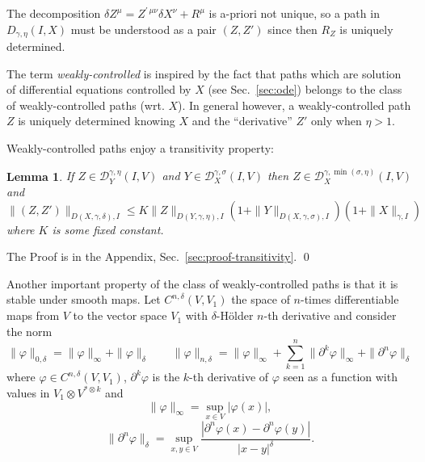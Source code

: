 \documentclass[a4paper,12pt,reqno]{amsproc}
\newcommand{\der}{\delta\!}
\newcommand{\DD}{\mathcal{D}}
\newtheorem{lemma}{Lemma}
\begin{document}
The decomposition $\der Z^\mu =  Z^{\prime\,\mu\nu} \der X^\nu + R^\mu$ is a-priori not
unique, so a path in $D_{\gamma,\eta}(I,X)$ must be understood as a
pair $(Z,Z')$ since then $R_Z$ is uniquely determined.

The term \emph{weakly-controlled} is inspired by the fact that paths
which are solution of differential equations controlled by $X$ (see
Sec.~\ref{sec:ode}) belongs to the class of weakly-controlled paths
(wrt. $X$). In general however, a weakly-controlled path $Z$ is 
uniquely determined knowing $X$ and the ``derivative'' $Z'$ only when
$\eta > 1$. 

Weakly-controlled paths enjoy  a transitivity property:
\begin{lemma}
  \label{lemma:transitivity}
If $Z \in
\DD_Y^{\gamma,\eta}(I,V)$ and $Y \in \DD_X^{\gamma,\sigma}(I,V)$ then $Z \in
\DD_X^{\gamma,\min(\sigma,\eta)}(I,V)$ and
\begin{equation*}
\|(Z,Z')\|_{D(X,\gamma,\delta),I} 
\le K \|Z\|_{D(Y,\gamma,\eta),I} (1+
   \|Y\|_{D(X,\gamma,\sigma),I})(1+ \|X\|_{\gamma,I})
\end{equation*}
where $K$ is some fixed constant.
\end{lemma}
\proof The Proof is in the Appendix,
Sec.~\ref{sec:proof-transitivity}. \qed

\bigskip
Another important property of the class of weakly-controlled paths 
is that it is
stable under smooth maps. Let $C^{n,\delta}(V,V_1)$ the space of $n$-times
differentiable maps from $V$ to the vector space $V_1$ with
$\delta$-H\"older $n$-th derivative and consider the norm
$$
\|\varphi\|_{0,\delta} = \|\varphi\|_\infty + \| \varphi\|_\delta
\qquad \|\varphi\|_{n,\delta} = \|\varphi\|_\infty + \sum_{k=1}^n
\|\partial^k \varphi \|_{\infty} + \|\partial^n \varphi\|_\delta
$$
where $\varphi \in C^{n,\delta}(V,V_1)$, $\partial^k \varphi$ is the
$k$-th derivative of $\varphi$ seen as a  function with values in
$V_1 \otimes V^{* \otimes k}$  and 
$$
\|\varphi \|_\infty = \sup_{x\in V} |\varphi(x)|,
$$
$$
\|\partial^n \varphi\|_\delta = \sup_{x,y \in V} \frac{|\partial^n
  \varphi(x) - \partial^n \varphi(y)|}{|x-y|^\delta}.
$$
\end{document}

